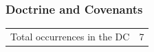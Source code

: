 				
		
	
		
		
	\subsubsection{Doctrine and Covenants} %
		\label{SUBDUE-DC}
	
		\begin{tabular}{ll}
			Total occurrences in the DC & 7
		\end{tabular}
		
		\begin{compactdesc}
			\item[{\hyperref[DC96-5]{DC 96:5}}]
		\end{compactdesc}
		
	
		
		
